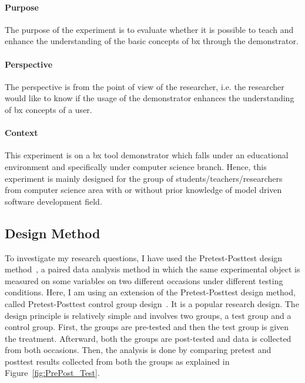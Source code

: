 \paragraph{Purpose}
The purpose of the experiment is to evaluate whether it is possible to teach and enhance the understanding of the basic concepts of bx through the demonstrator.

\paragraph{Perspective}
The perspective is from the point of view of the researcher, i.e. the researcher would like to know if the usage of the demonstrator enhances the understanding of bx concepts of a user.

\paragraph{Context}
This experiment is on a bx tool demonstrator which falls under an educational environment and specifically under computer science branch. Hence, this experiment is mainly designed for the group of students/teachers/researchers from computer science area with or without prior knowledge of model driven software development field.

\subsection{Design Method}\label{subsec:designmethod} 
To investigate my research questions, I have used the Pretest-Posttest design method~\cite{analysisprepostdesigns}, a paired data analysis method in which the same experimental object is measured on some variables on two different occasions under different testing conditions. Here, I am using an extension of the Pretest-Posttest design method, called Pretest-Posttest control group design~\cite{expandquasiexpdesign}. It is a popular research design. The design principle is relatively simple and involves two groups, a test group and a control group. First, the groups are pre-tested and then the test group is given the treatment. Afterward, both the groups are post-tested and data is collected from both occasions. Then, the analysis is done by comparing pretest and posttest results collected from both the groups as explained in Figure~\ref{fig:PrePost_Test}.


